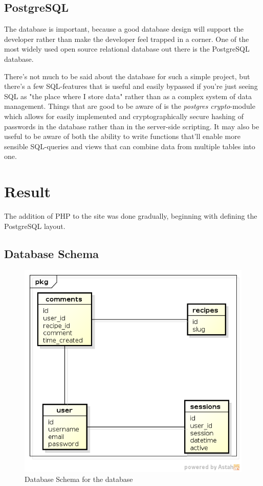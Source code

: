 \documentclass[a4paper]{scrartcl}
\begin{document}
\subsection{PostgreSQL}

The database is important, because a good database design will support the developer rather than make the developer feel trapped in a corner. One of the most widely used open source relational database out there is the PostgreSQL database.

There's not much to be said about the database for such a simple project, but there's a few SQL-features that is useful and easily bypassed if you're just seeing SQL as "the place where I store data" rather than as a complex system of data management. Things that are good to be aware of is the \textit{postgres crypto}-module which  allows for easily implemented and cryptographically secure hashing of passwords in the database rather than in the server-side scripting. It may also be useful to be aware of both the ability to write functions that'll enable more sensible SQL-queries and views that can combine data from multiple tables into one.

\section{Result}
\label{sec:results}

The addition of PHP to the site was done gradually, beginning with defining the PostgreSQL layout.

\subsection{Database Schema}

\begin{figure}[!h]
  \begin{center}
    \includegraphics[scale=0.6]{database_schema.png}
    \caption{Database Schema for the database}
    \label{fig:schema}
  \end{center}
\end{figure}
\end{document}
